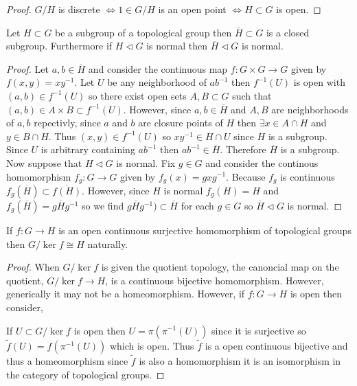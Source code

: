 \documentclass[12pt]{extarticle}
\begin{document}
\begin{proof}
$G / H$ is discrete $\iff 1 \in G / H$ is an open point $\iff H \subset G$ is open. 
\end{proof}

\begin{proposition}
Let $H \subset G$ be a subgroup of a topological group then $\overline{H} \subset G$ is a closed subgroup. Furthermore if $H \triangleleft G$ is normal then $\overline{H} \triangleleft G$ is normal.
\end{proposition}

\begin{proof}
Let $a,b \in \overline{H}$ and consider the continuous map $f : G \times G \to G$ given by $f(x,y) = x y^{-1}$. Let $U$ be any neighborhood of $ab^{-1}$ then $f^{-1}(U)$ is open with $(a, b) \in f^{-1}(U)$ so there exist open sets $A, B \subset G$ such that $(a, b) \in A \times B \subset f^{-1}(U)$. However, since $a, b \in \overline{H}$ and $A,B$ are neighborhoods of $a,b$ repectivly, since $a$ and $b$ are closure points of $H$ then $\exists x \in A \cap H$ and $y \in B \cap H$. Thus $(x, y) \in f^{-1}(U)$ so $xy^{-1} \in H \cap U$ since $H$ is a subgroup. Since $U$ is arbitrary containing $a b^{-1}$ then $a b^{-1} \in \overline{H}$. Therefore $\overline{H}$ is a subgroup. 
\bigskip\\
Now suppose that $H \triangleleft G$ is normal. Fix $g \in G$ and consider the continous homomorphism $f_g : G \to G$ given by $f_g(x) = g x g^{-1}$. Because $f_g$ is continuous $f_g(\overline{H}) \subset \overline{f(H)}$. However, since $H$ is normal $f_g(H) = H$ and $f_g(\overline{H}) = g \overline{H} g^{-1}$ so we find $g \overline{H} g^{-1}) \subset \overline{H}$ for each $g \in G$ so $\overline{H} \triangleleft G$ is normal. 
\end{proof}



\begin{theorem} \label{quotient_condition}
If $f : G \to H$ is an open continuous surjective homomorphism of topological groups then $G / \ker{f} \cong H$ naturally.
\end{theorem}

\begin{proof}
When $G / \ker{f}$ is given the quotient topology, the canoncial map on the quotient, $G / \ker{f} \to H$, is a continuous bijective homomorphism. However, generically it may not be a homeomorphism. However, if $f : G \to H$ is open then consider,
\begin{center}
\end{center}
If $U \subset G / \ker{f}$ is open then $U = \pi(\pi^{-1}(U))$ since it is surjective so $\tilde{f}(U) = f(\pi^{-1}(U))$ which is open. Thus $\tilde{f}$ is a open continuous bijective and thus a homeomorphism since $\tilde{f}$ is also a homomorphism it is an isomorphism in the category of topological groups.
\end{proof}
\end{document}
